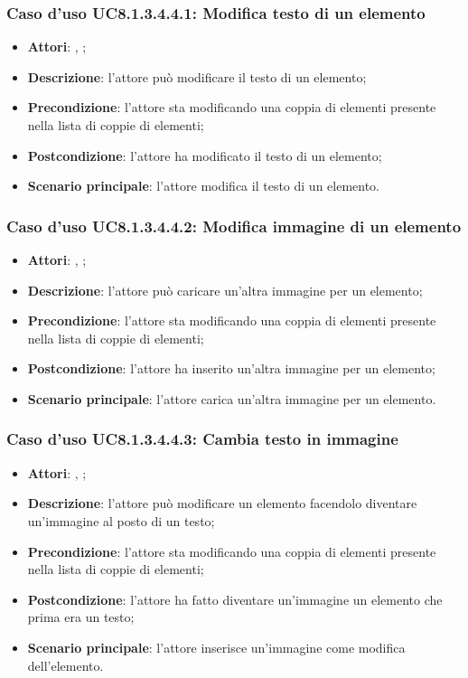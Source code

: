 		\subsubsection{Caso d'uso UC8.1.3.4.4.1: Modifica testo di un elemento}
		\label{UC8.1.3.4.4.1}
		\begin{itemize}
			\item \textbf{Attori}: \uau, \uaupro;
			\item \textbf{Descrizione}: l'attore può modificare il testo di un elemento;
			\item \textbf{Precondizione}: l'attore sta modificando una coppia di elementi presente nella lista di coppie di elementi; 
			\item \textbf{Postcondizione}: l'attore ha modificato il testo di un elemento;
			\item \textbf{Scenario principale}: l'attore modifica il testo di un elemento.  
		\end{itemize}
		
		\subsubsection{Caso d'uso UC8.1.3.4.4.2: Modifica immagine di un elemento}
		\label{UC8.1.3.4.4.2}
		\begin{itemize}
			\item \textbf{Attori}: \uau, \uaupro;
			\item \textbf{Descrizione}: l'attore può caricare un'altra immagine per un elemento;
			\item \textbf{Precondizione}: l'attore sta modificando una coppia di elementi presente nella lista di coppie di elementi; 
			\item \textbf{Postcondizione}: l'attore ha inserito un'altra immagine per un elemento;
			\item \textbf{Scenario principale}: l'attore carica un'altra immagine per un elemento.
		\end{itemize}
		
		\subsubsection{Caso d'uso UC8.1.3.4.4.3: Cambia testo in immagine}
		\label{UC8.1.3.4.4.3}
		\begin{itemize}
			\item \textbf{Attori}: \uau, \uaupro;
			\item \textbf{Descrizione}: l'attore può modificare un elemento facendolo diventare un'immagine al posto di un testo;
			\item \textbf{Precondizione}: l'attore sta modificando una coppia di elementi presente nella lista di coppie di elementi; 
			\item \textbf{Postcondizione}: l'attore ha fatto diventare un'immagine un elemento che prima era un testo;
			\item \textbf{Scenario principale}: l'attore inserisce un'immagine come modifica dell'elemento.  
		\end{itemize}
		
